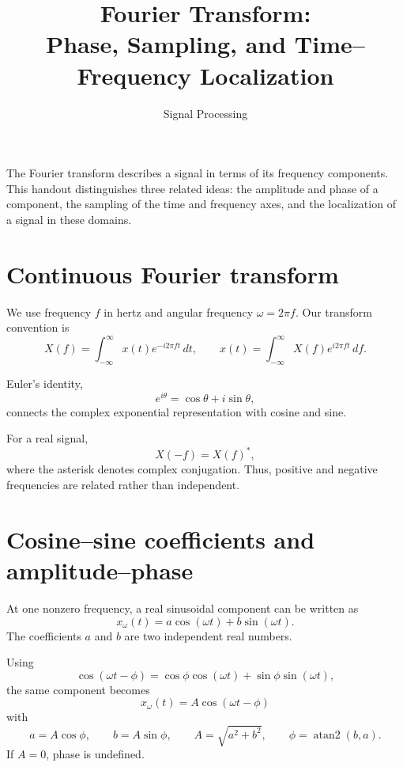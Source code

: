 \documentclass[11pt,letterpaper]{article}
\title{Fourier Transform:\\
Phase, Sampling, and Time--Frequency Localization}
\author{Signal Processing}
\date{}
\begin{document}
\maketitle

The Fourier transform describes a signal in terms of its frequency
components. This handout distinguishes three related ideas:
the amplitude and phase of a component, the sampling of the time and
frequency axes, and the localization of a signal in these domains.

\section{Continuous Fourier transform}

We use frequency $f$ in hertz and angular frequency
$\omega=2\pi f$. Our transform convention is
\begin{equation}
\boxed{
X(f)=\int_{-\infty}^{\infty}x(t)e^{-i2\pi ft}\,dt,
\qquad
x(t)=\int_{-\infty}^{\infty}X(f)e^{i2\pi ft}\,df.
}
\end{equation}

Euler's identity,
\[
e^{i\theta}=\cos\theta+i\sin\theta,
\]
connects the complex exponential representation with cosine and sine.

For a real signal,
\[
X(-f)=X(f)^*,
\]
where the asterisk denotes complex conjugation. Thus, positive and
negative frequencies are related rather than independent.

\section{Cosine--sine coefficients and amplitude--phase}

At one nonzero frequency, a real sinusoidal component can be written as
\begin{equation}
x_\omega(t)=a\cos(\omega t)+b\sin(\omega t).
\end{equation}
The coefficients $a$ and $b$ are two independent real numbers.

Using
\[
\cos(\omega t-\phi)
=\cos\phi\cos(\omega t)+\sin\phi\sin(\omega t),
\]
the same component becomes
\begin{equation}
\boxed{x_\omega(t)=A\cos(\omega t-\phi)}
\end{equation}
with
\begin{equation}
\boxed{
a=A\cos\phi,\qquad b=A\sin\phi,\qquad
A=\sqrt{a^2+b^2},\qquad
\phi=\operatorname{atan2}(b,a).
}
\end{equation}
If $A=0$, phase is undefined.
\end{document}
